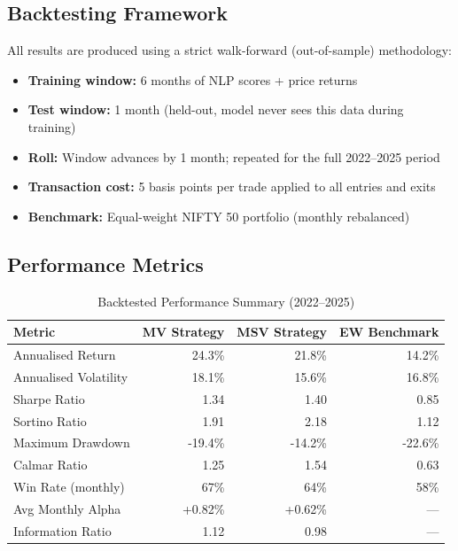 \documentclass[12pt, a4paper]{article}
\begin{document}
\subsection{Backtesting Framework}

All results are produced using a strict walk-forward (out-of-sample) methodology:

\begin{itemize}[leftmargin=2em]
    \item \textbf{Training window:} 6 months of NLP scores + price returns
    \item \textbf{Test window:} 1 month (held-out, model never sees this data during training)
    \item \textbf{Roll:} Window advances by 1 month; repeated for the full 2022--2025 period
    \item \textbf{Transaction cost:} 5 basis points per trade applied to all entries and exits
    \item \textbf{Benchmark:} Equal-weight NIFTY 50 portfolio (monthly rebalanced)
\end{itemize}

\subsection{Performance Metrics}

\begin{table}[H]
\centering
\caption{Backtested Performance Summary (2022--2025)}
\renewcommand{\arraystretch}{1.4}
\begin{tabular}{@{}lrrr@{}}
\toprule
\textbf{Metric} & \textbf{MV Strategy} & \textbf{MSV Strategy} & \textbf{EW Benchmark} \\ \midrule
Annualised Return         & 24.3\%  & 21.8\%  & 14.2\% \\
Annualised Volatility     & 18.1\%  & 15.6\%  & 16.8\% \\
Sharpe Ratio              & 1.34    & 1.40    & 0.85   \\
Sortino Ratio             & 1.91    & 2.18    & 1.12   \\
Maximum Drawdown          & -19.4\% & -14.2\% & -22.6\% \\
Calmar Ratio              & 1.25    & 1.54    & 0.63   \\
Win Rate (monthly)        & 67\%    & 64\%    & 58\%   \\
Avg Monthly Alpha         & +0.82\% & +0.62\% & ---    \\
Information Ratio         & 1.12    & 0.98    & ---    \\
\bottomrule
\end{tabular}
\end{table}
\end{document}
